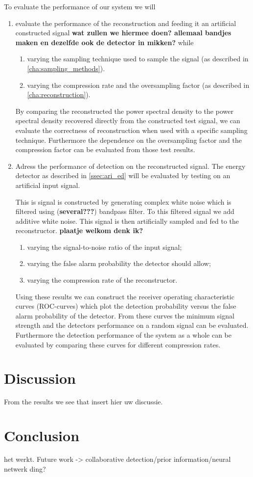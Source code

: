\documentclass[a4paper, openany, oneside]{memoir}
\begin{document}
To evaluate the performance of our system we will 
\begin{enumerate}
	\item evaluate the performance of the reconstruction and feeding it an artificial constructed signal \textbf{wat zullen we hiermee doen? allemaal bandjes maken en dezelfde ook de detector in mikken?} while

	\begin{enumerate}
		\item varying the sampling technique used to sample the signal (as described in \cref{cha:sampling_methods}).
		\item varying the compression rate and the oversampling factor (as described in \cref{cha:reconstruction}).
	\end{enumerate}

	By comparing the reconstructed the power spectral density to the power spectral density recovered directly from the constructed test signal, we can evaluate the correctness of reconstruction when used with a specific sampling technique.
	Furthermore the dependence on the oversampling factor and
	the compression factor can be evaluated from those test results. 
	
	\item Adress the performance of detection on the reconstructed signal. The energy detector as described in \cref{ssec:ari_ed} will be evaluated by testing on an artificial input signal. 

	This is signal is constructed by generating complex white noise which is filtered using (\textbf{several???}) bandpass filter. To this filtered signal we add additive white noise. This signal is then artificially sampled and fed to the reconstructor. 
	\textbf{plaatje welkom denk ik?}
	
	\begin{enumerate}
		\item varying the signal-to-noise ratio of the input signal; 
		\item varying the false alarm probability the detector 
		should allow;
		\item varying the compression rate of the reconstructor.
	\end{enumerate}
	Using these results we can construct the receiver operating characteristic curves (ROC-curves) which plot the detection probability versus the false alarm probability of the detector. 
	From these curves the minimum signal strength and the detectors performance on a random signal can be evaluated. Furthermore the detection performance of the system as a whole can be evaluated by comparing these curves for different compression rates.
	\end{enumerate}

\section{Discussion}
From the results we see that insert hier uw discussie.

\section{Conclusion}
het werkt. Future work -> collaborative detection/prior information/neural netwerk ding?
\end{document}
